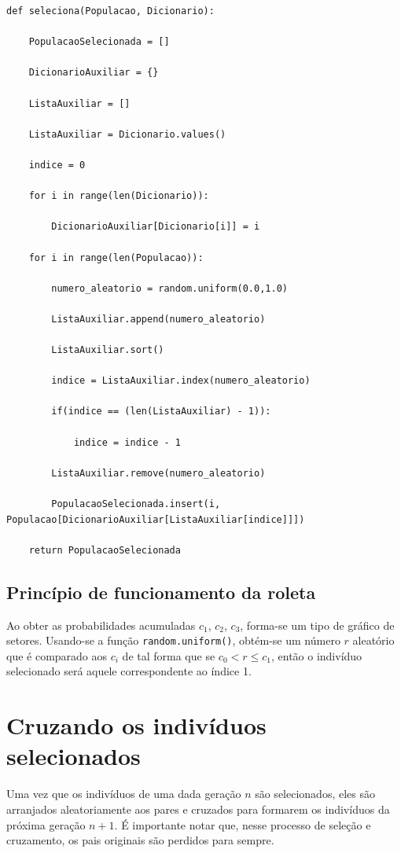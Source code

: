 \documentclass[11pt]{article}
\begin{document}
\begin{lstlisting}
def seleciona(Populacao, Dicionario):
	
	PopulacaoSelecionada = []
	
	DicionarioAuxiliar = {}
	
	ListaAuxiliar = []
	
	ListaAuxiliar = Dicionario.values()
	
	indice = 0
	
	for i in range(len(Dicionario)):
		
		DicionarioAuxiliar[Dicionario[i]] = i	
	
	for i in range(len(Populacao)):
		
		numero_aleatorio = random.uniform(0.0,1.0)
		
		ListaAuxiliar.append(numero_aleatorio)
		
		ListaAuxiliar.sort()
		
		indice = ListaAuxiliar.index(numero_aleatorio)
		
		if(indice == (len(ListaAuxiliar) - 1)):
		
			indice = indice - 1
		
		ListaAuxiliar.remove(numero_aleatorio)
		
		PopulacaoSelecionada.insert(i, Populacao[DicionarioAuxiliar[ListaAuxiliar[indice]]])
	
	return PopulacaoSelecionada
\end{lstlisting}

\subsection{Princípio de funcionamento da roleta}

Ao obter as probabilidades acumuladas $c_1$, $c_2$, $c_3$, forma-se um tipo de gráfico de setores. Usando-se a função \texttt{random.uniform()}, obtém-se um número $r$ aleatório que é comparado aos $c_i$ de tal forma que se $c_0 < r \leqslant c_1$, então o indivíduo selecionado será aquele correspondente ao índice 1.

\section{Cruzando os indivíduos selecionados}

Uma vez que os indivíduos de uma dada geração $n$ são selecionados, eles são arranjados aleatoriamente aos pares e cruzados para formarem os indivíduos da próxima geração $n+1$. É importante notar que, nesse processo de seleção e cruzamento, os pais originais são perdidos para sempre.
\end{document}
